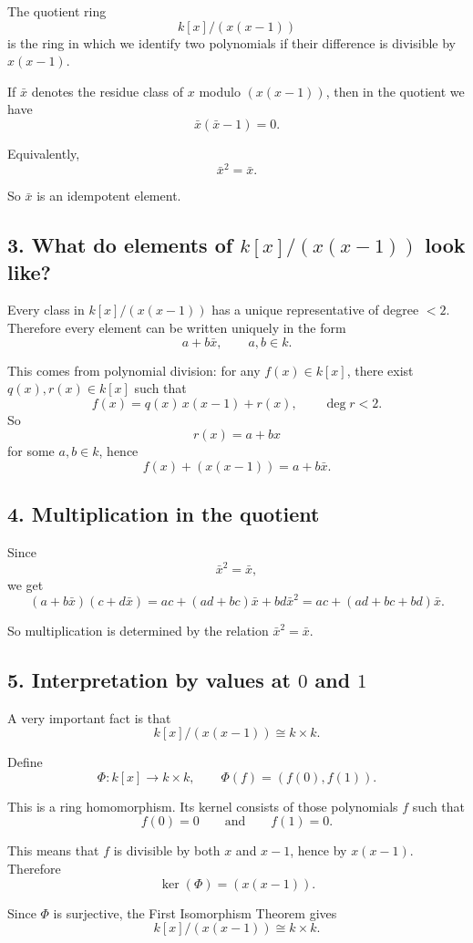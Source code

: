 \documentclass[12pt,a4paper]{article}
\theoremstyle{notespace}
\begin{document}
The quotient ring
\[
k[x]/(x(x-1))
\]
is the ring in which we identify two polynomials if their difference is divisible by \(x(x-1)\).

If \(\bar x\) denotes the residue class of \(x\) modulo \((x(x-1))\), then in the quotient we have
\[
\bar x(\bar x-1)=0.
\]

Equivalently,
\[
\bar x^2=\bar x.
\]

So \(\bar x\) is an idempotent element.

\subsection{3. What do elements of \(k[x]/(x(x-1))\) look like?}

Every class in \(k[x]/(x(x-1))\) has a unique representative of degree \(<2\). Therefore every element can be written uniquely in the form
\[
a+b\bar x,
\qquad a,b\in k.
\]

This comes from polynomial division: for any \(f(x)\in k[x]\), there exist \(q(x),r(x)\in k[x]\) such that
\[
f(x)=q(x)\,x(x-1)+r(x),
\qquad \deg r<2.
\]
So
\[
r(x)=a+bx
\]
for some \(a,b\in k\), hence
\[
f(x)+(x(x-1)) = a+b\bar x.
\]

\subsection{4. Multiplication in the quotient}

Since
\[
\bar x^2=\bar x,
\]
we get
\[
(a+b\bar x)(c+d\bar x)
=
ac+(ad+bc)\bar x+bd\bar x^2
=
ac+(ad+bc+bd)\bar x.
\]

So multiplication is determined by the relation \(\bar x^2=\bar x\).

\subsection{5. Interpretation by values at \(0\) and \(1\)}

A very important fact is that
\[
k[x]/(x(x-1))\cong k\times k.
\]

Define
\[
\Phi:k[x]\longrightarrow k\times k,
\qquad
\Phi(f)=(f(0),f(1)).
\]

This is a ring homomorphism. Its kernel consists of those polynomials \(f\) such that
\[
f(0)=0
\qquad\text{and}\qquad
f(1)=0.
\]

This means that \(f\) is divisible by both \(x\) and \(x-1\), hence by \(x(x-1)\). Therefore
\[
\ker(\Phi)=(x(x-1)).
\]

Since \(\Phi\) is surjective, the First Isomorphism Theorem gives
\[
k[x]/(x(x-1))\cong k\times k.
\]
\end{document}
